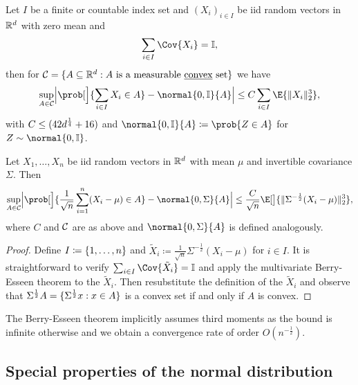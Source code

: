 \begin{fact}
    \label{fact: multivariate berry esseen}
    Let \(I\) be a finite or countable index set and \((X_i)_{i\in I}\) be iid
    random vectors in \(\mathbb{R}^d\) with zero mean and
    \[
        \sum_{i\in I} \Cov{X_i} = \identity,
    \]
    then for \(\mathcal{C} = \{A\subseteq \mathbb{R}^d: A \text{ is a measurable \underline{convex} set}\}\) we have
    \[
        \sup_{A \in \cC} \abs[\Big]{\prob[\Big]{\sum_{i\in I} X_i \in A} - \normal{0, \identity}\set{A}}
        \le C\sum_{i\in I}\E{\|X_i\|_2^3},
    \]
    with \(C\le (42d^{\frac14}+16)\) and
    \(\normal{0, \identity}\set{A} \coloneq \prob{Z \in A}\) for \(Z\sim \normal{0, \identity}\).
\end{fact}

\begin{corollary}
    Let \(X_1, \dots, X_n\) be iid random vectors in \(\mathbb{R}^d\)
    with mean \(\mu\) and invertible covariance \(\Sigma\). Then
    \[
        \sup_{A \in \cC} \abs[\Big]{\prob[\Big]{\frac1{\sqrt{n}}\sum_{i=1}^n(X_i - \mu) \in A} - \normal{0, \Sigma}\set{A}}
        \le \frac{C}{\sqrt{n}}\E[\big]{\|\Sigma^{-\frac12}(X_i-\mu)\|_2^3},
    \]
    where \(C\) and \(\mathcal{C}\) are as above and \(\normal{0, \Sigma}\set{A}\)
    is defined analogously.
\end{corollary}
\begin{proof}
    Define \(I \coloneq \{1, \dots, n\}\) and
    \(\tilde{X}_i \coloneq \tfrac1{\sqrt{n}}\Sigma^{-\frac12}(X_i - \mu)\)
    for \(i\in I\).
    It is straightforward to verify \(\sum_{i\in I} \Cov{\tilde{X}_i}=
    \identity\) and apply the multivariate Berry-Esseen theorem to the \(\tilde{X}_i\).
    Then resubstitute the definition of the \(\tilde{X}_i\) and observe that
    \(\Sigma^{\frac12}A = \{\Sigma^{\frac12}x : x \in A\}\) is a convex set if and only if \(A\) is convex.
\end{proof}
The Berry-Esseen theorem implicitly assumes third moments as the bound
is infinite otherwise and we obtain a convergence rate of order \(O(n^{-\frac12})\).



\subsection{Special properties of the normal distribution}

